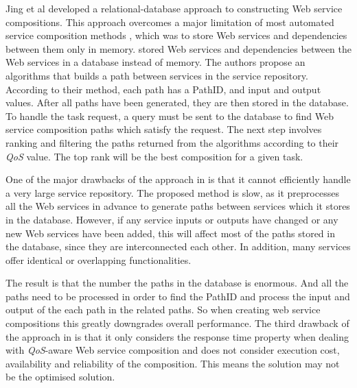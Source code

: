 Jing et al \cite{26} developed a relational-database approach to constructing Web service compositions. This approach overcomes a major limitation of most automated service composition methods \cite{2,5}, which was to store Web services and dependencies between them only in memory. \cite{26} stored Web services and dependencies between the Web services in a database instead of memory. The authors propose an algorithms that builds a path between services in the service repository. According to their method, each path has a PathID, and input and output values. After all paths have been generated, they are then stored in the database. To handle the task request, a query must be sent to the database to find Web service composition paths which satisfy the request. The next step involves ranking and filtering the paths returned from the algorithms according to their \emph{QoS} value. The top rank will be the best composition for a given task. \par
One of the major drawbacks of the approach in \cite{26} is that it cannot efficiently handle a very large service repository. The proposed method is slow, as it preprocesses all the Web services in advance to generate paths between services which it stores in the database. However, if any service inputs or outputs have changed or any new Web services have been added, this will affect most of the paths stored in the database, since they are interconnected each other. In addition, many services offer identical or overlapping functionalities.\par
The result is that the number the paths in the database is enormous. And all the paths need to be processed in order to find the PathID and process the input and output of the each path in the related paths. So when creating web service compositions this greatly downgrades overall performance. The third drawback of the approach in \cite{26} is that it only considers the response time property when dealing with \emph{QoS}-aware Web service composition and does not consider execution cost, availability and reliability of the composition. This means the solution may not be the optimised solution.\par


